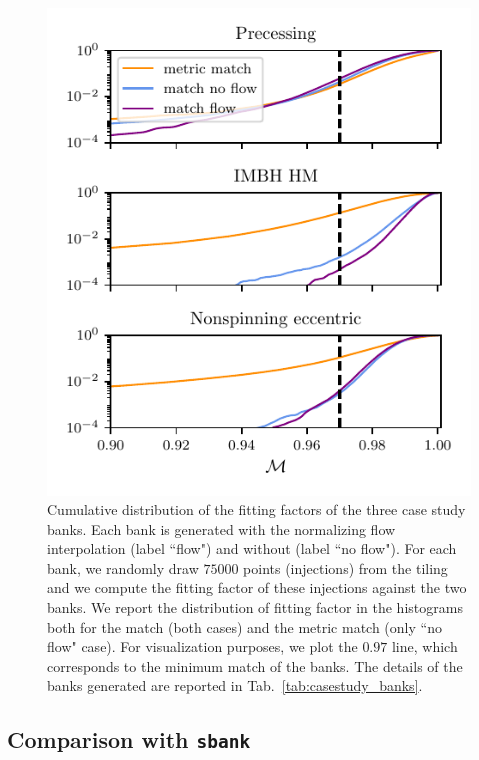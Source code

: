 \documentclass[twocolumn,showpacs,preprintnumbers,nofootinbib,prd,
superscriptaddress,10pt]{revtex4-2}
\newcommand{\stefano}[1]{{\textcolor{blue}{\texttt{SS: #1}} }}
\begin{document}
\begin{figure}[t!]
	\includegraphics{bank_injections_flow}
	\caption{
	Cumulative distribution of the fitting factors of the three case study banks. Each bank is generated with the normalizing flow interpolation (label ``flow") and without (label ``no flow"). For each bank, we randomly draw $75000$ points (injections) from the tiling and we compute the fitting factor of these injections against the two banks. We report the distribution of fitting factor in the histograms both for the match (both cases) and the metric match (only ``no flow" case). For visualization purposes, we plot the $0.97$ line, which corresponds to the minimum match of the banks.
	The details of the banks generated are reported in Tab.~\ref{tab:casestudy_banks}.
	}
	\label{fig:bank_injections}
\end{figure}

\subsection{Comparison with \texttt{sbank} }\label{sec:sbank_comparison}
\end{document}
